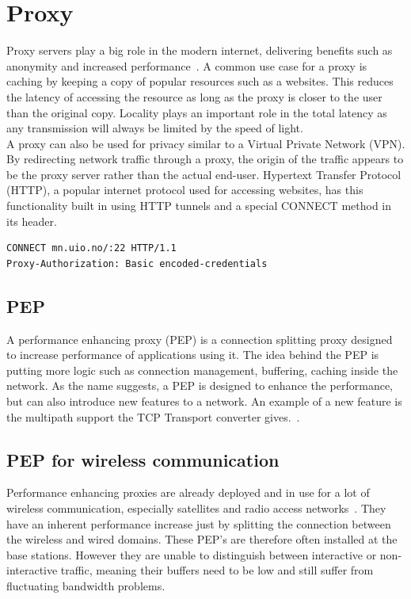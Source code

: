 \documentclass[a4paper,english, 11pt]{report}
\begin{document}
\section{Proxy}
Proxy servers play a big role in the modern internet, delivering benefits such as anonymity and increased performance~\cite{nextgen_proxy_servers}. A common use case for a proxy is caching by keeping a copy of popular resources such as a websites. This reduces the latency of accessing the resource as long as the proxy is closer to the user than the original copy. Locality plays an important role in the total latency as any transmission will always be limited by the speed of light.\\

A proxy can also be used for privacy similar to a Virtual Private Network (VPN). By redirecting network traffic through a proxy, the origin of the traffic appears to be the proxy server rather than the actual end-user. Hypertext Transfer Protocol (HTTP), a popular internet protocol used for accessing websites, has this functionality built in using HTTP tunnels and a special CONNECT method in its header.\\

\begin{verbatim}
CONNECT mn.uio.no/:22 HTTP/1.1
Proxy-Authorization: Basic encoded-credentials
\end{verbatim}

\subsection{PEP}
A performance enhancing proxy (PEP) is a connection splitting proxy designed to increase performance of applications using it. The idea behind the PEP is putting more logic such as connection management, buffering, caching inside the network. As the name suggests, a PEP is designed to enhance the performance, but can also introduce new features to a network. An example of a new feature is the multipath support the TCP Transport converter gives.~\cite{rfc8803}.

\subsection{PEP for wireless communication}
Performance enhancing proxies are already deployed and in use for a lot of wireless communication, especially satellites and radio access networks~\cite{tcp_mmwave_proxy}. They have an inherent performance increase just by splitting the connection between the wireless and wired domains. These PEP's are therefore often installed at the base stations. However they are unable to distinguish between interactive or non-interactive traffic, meaning their buffers need to be low and still suffer from fluctuating bandwidth problems.
\end{document}
